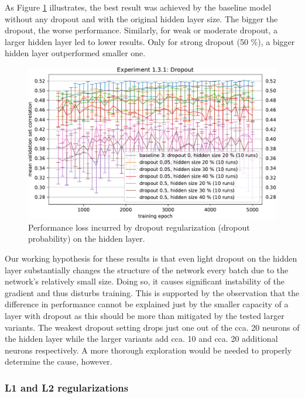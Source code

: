 As Figure \ref{fig:5.1.3.1} illustrates, the best result was achieved by the baseline model without any dropout and with the original hidden layer size. The bigger the dropout, the worse performance. Similarly, for weak or moderate dropout, a larger hidden layer led to lower results. Only for strong dropout (50 \%), a bigger hidden layer outperformed smaller one.

\begin{figure}[H]
    \centering
    \includegraphics[width=1\textwidth]{../figures/05_1_3_1}
    \caption[Experiment 1.3.1]{Performance loss incurred by dropout regularization (dropout probability) on the hidden layer.}
    \label{fig:5.1.3.1}
\end{figure}

Our working hypothesis for these results is that even light dropout on the hidden layer substantially changes the structure of the network every batch due to the network’s relatively small size. Doing so, it causes significant instability of the gradient and thus disturbs training. This is supported by the observation that the difference in performance cannot be explained just by the smaller capacity of a layer with dropout as this should be more than mitigated by the tested larger variants. The weakest dropout setting drops just one out of the cca. 20 neurons of the hidden layer while the larger variants add cca. 10 and cca. 20 additional neurons respectively. A more thorough exploration would be needed to properly determine the cause, however.

\subsubsection{L1 and L2 regularizations}

